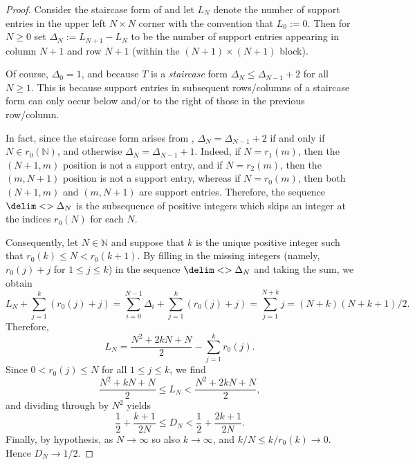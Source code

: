 \documentclass[10pt,reqno]{amsart}
\theoremstyle{remark}
\newcommand{\seq}{\delim<>}
\numberwithin{equation}{section}
\begin{document}
\begin{proof}
  Consider the staircase form of  and let $L_N$ denote the number of support entries in the upper left $N \times N$ corner with the convention that $L_0 := 0$.
  Then for $N \ge 0$ set $\Delta_N := L_{N+1} - L_N$ to be the number of support entries appearing in column $N+1$ and row $N+1$ (within the $(N+1) \times (N+1)$ block).

  Of course, $\Delta_0 = 1$, and because $T$ is a \emph{staircase} form $\Delta_N \le \Delta_{N-1} + 2$ for all $N \ge 1$.
  This is because support entries in subsequent rows/columns of a staircase form can only occur below and/or to the right of those in the previous row/column.

  In fact, since the staircase form arises from , $\Delta_N = \Delta_{N-1} + 2$ if and only if $N \in r_0(\mathbb{N})$, and otherwise $\Delta_N = \Delta_{N-1} + 1$.
  Indeed, if $N = r_1(m)$, then the $(N+1,m)$ position is not a support entry, and if $N = r_2(m)$, then the $(m,N+1)$ position is not a support entry, whereas if $N = r_0(m)$, then both $(N+1,m)$ and $(m,N+1)$ are support entries.
  Therefore, the sequence $\seq{\Delta_N}$ is the subsequence of positive integers which skips an integer at the indices $r_0(N)$ for each $N$.

  Consequently, let $N \in \mathbb{N}$ and suppose that $k$ is the unique positive integer such that $r_0(k) \le N < r_0(k+1)$.
  By filling in the missing integers (namely, $r_0(j) + j$ for $1 \le j \le k$) in the sequence $\seq{\Delta_N}$ and taking the sum, we obtain
  \begin{equation*}
    L_N + \sum_{j=1}^k (r_0(j) + j) = \sum_{i=0}^{N-1} \Delta_i + \sum_{j=1}^k (r_0(j) + j) = \sum_{j=1}^{N+k} j = (N+k)(N+k+1)/2.
  \end{equation*}
  Therefore,
  \begin{equation*}
    L_N = \frac{N^2 + 2kN + N}{2} - \sum_{j=1}^k r_0(j).
  \end{equation*}
  Since $0 < r_0(j) \le N$ for all $1 \le j \le k$, we find
  \begin{equation*}
    \frac{N^2 + kN + N}{2} \le L_N < \frac{N^2 + 2kN + N}{2},
  \end{equation*}
  and dividing through by $N^2$ yields
  \begin{equation*}
    \frac{1}{2} + \frac{k + 1}{2N} \le D_N < \frac{1}{2} + \frac{2k + 1}{2N}.
  \end{equation*}
  Finally, by hypothesis, as $N \to \infty$ so also $k \to \infty$, and $k/N \le k/r_0(k) \to 0$.
  Hence $D_N \to 1/2$.
\end{proof}
\end{document}
